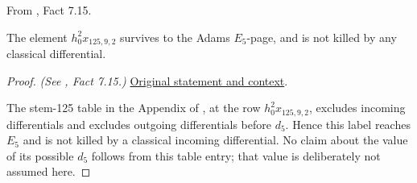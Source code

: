 \begin{fact}
\label{paper:7.15}
From \cite{LWX126}, Fact 7.15.\par
\label{fact:h_0_sq_mul_x_125_9_2}\label{fact:h02x1259}
    The element $h_0^2x_{125,9,2}$ survives to the Adams $E_5$-page, and is not killed by any classical differential.




\end{fact}
\begin{proof}
\textit{(See \cite{LWX126}, Fact 7.15.)} \href{paper/main.tex.html#L2466}{Original statement and context}.

The stem-125 table in the Appendix of \cite{LWX126}, at the row $h_0^2x_{125,9,2}$, excludes incoming differentials and excludes outgoing differentials before $d_5$. Hence this label reaches $E_5$ and is not killed by a classical incoming differential. No claim about the value of its possible $d_5$ follows from this table entry; that value is deliberately not assumed here.
\end{proof}

